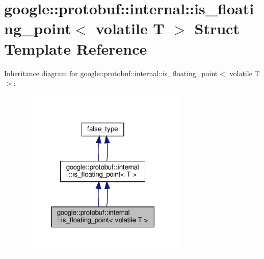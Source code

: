 \hypertarget{structgoogle_1_1protobuf_1_1internal_1_1is__floating__point_3_01volatile_01T_01_4}{}\section{google\+:\+:protobuf\+:\+:internal\+:\+:is\+\_\+floating\+\_\+point$<$ volatile T $>$ Struct Template Reference}
\label{structgoogle_1_1protobuf_1_1internal_1_1is__floating__point_3_01volatile_01T_01_4}


Inheritance diagram for google\+:\+:protobuf\+:\+:internal\+:\+:is\+\_\+floating\+\_\+point$<$ volatile T $>$\+:
\nopagebreak
\begin{figure}[H]
\begin{center}
\leavevmode
\includegraphics[width=231pt]{structgoogle_1_1protobuf_1_1internal_1_1is__floating__point_3_01volatile_01T_01_4__inherit__graph}
\end{center}
\end{figure}



